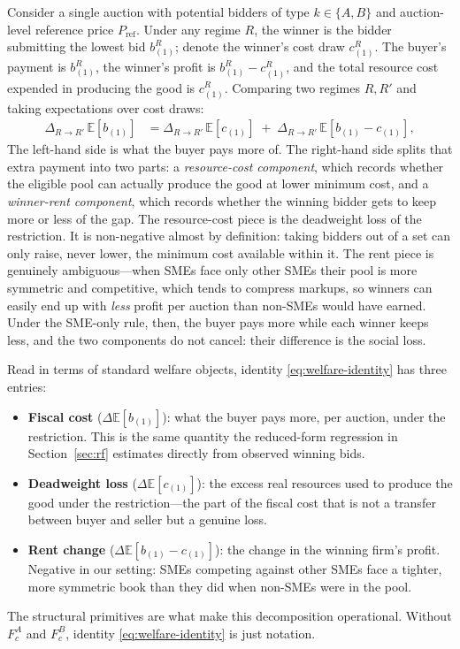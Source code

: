 \documentclass[12pt]{article}
\begin{document}
Consider a single auction with potential bidders of type
$k \in \{A, B\}$ and auction-level reference price $P_{\text{ref}}$.
Under any regime $R$, the winner is the bidder submitting the
lowest bid $b_{(1)}^R$; denote the winner's cost draw $c_{(1)}^R$. The
buyer's payment is $b_{(1)}^R$, the winner's profit is
$b_{(1)}^R - c_{(1)}^R$, and the total resource cost expended in
producing the good is $c_{(1)}^R$. Comparing two regimes $R, R'$ and
taking expectations over cost draws:
\begin{align}
\Delta_{R \to R'}\, \mathbb{E}[b_{(1)}] &= \Delta_{R \to R'}\, \mathbb{E}[c_{(1)}]
\;+\; \Delta_{R \to R'}\, \mathbb{E}[b_{(1)} - c_{(1)}],
\label{eq:welfare-identity}
\end{align}
The left-hand side is what the buyer pays more of. The right-hand
side splits that extra payment into two parts: a \emph{resource-cost
component}, which records whether the eligible pool can actually
produce the good at lower minimum cost, and a \emph{winner-rent
component}, which records whether the winning bidder gets to keep
more or less of the gap. The resource-cost piece is the deadweight
loss of the restriction. It is non-negative almost by definition:
taking bidders out of a set can only raise, never lower, the
minimum cost available within it. The rent piece is genuinely
ambiguous---when SMEs face only other SMEs their pool is more
symmetric and competitive, which tends to compress markups, so
winners can easily end up with \emph{less} profit per auction than
non-SMEs would have earned. Under the SME-only rule, then, the
buyer pays more while each winner keeps less, and the two
components do not cancel: their difference is the social loss.

Read in terms of standard welfare objects, identity
\eqref{eq:welfare-identity} has three entries:
\begin{itemize}
    \item \textbf{Fiscal cost} ($\Delta \mathbb{E}[b_{(1)}]$): what
      the buyer pays more, per auction, under the restriction. This
      is the same quantity the reduced-form regression in
      Section~\ref{sec:rf} estimates directly from observed winning
      bids.
    \item \textbf{Deadweight loss} ($\Delta \mathbb{E}[c_{(1)}]$):
      the excess real resources used to produce the good under the
      restriction---the part of the fiscal cost that is not a
      transfer between buyer and seller but a genuine loss.
    \item \textbf{Rent change} ($\Delta \mathbb{E}[b_{(1)} - c_{(1)}]$):
      the change in the winning firm's profit. Negative in our
      setting: SMEs competing against other SMEs face a tighter,
      more symmetric book than they did when non-SMEs were in the
      pool.
\end{itemize}
The structural primitives are what make this decomposition
operational. Without $F_c^A$ and $F_c^B$, identity
\eqref{eq:welfare-identity} is just notation.
\end{document}
